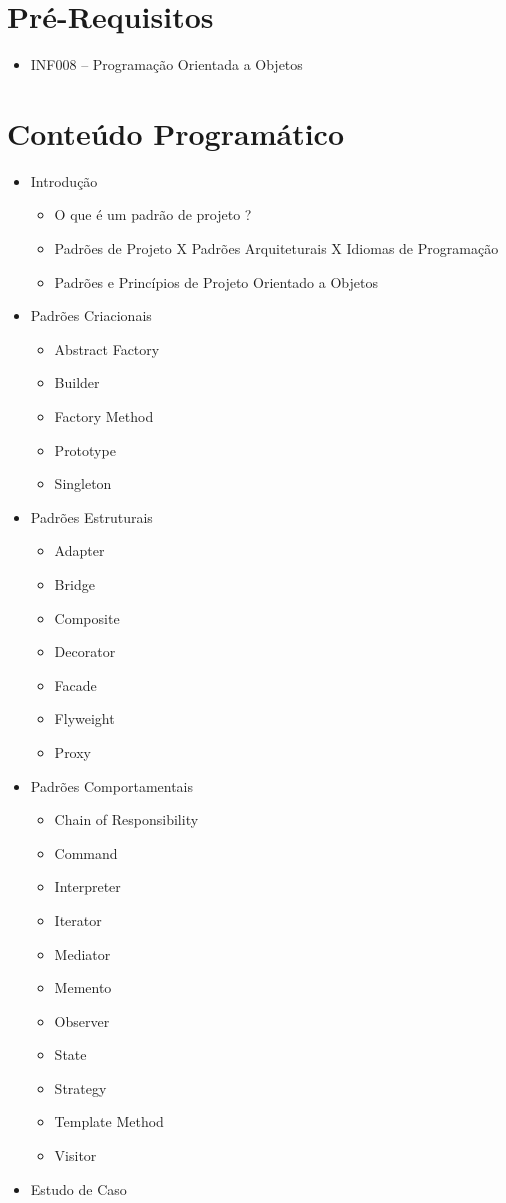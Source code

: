\documentclass[11pt,a4paper,sans]{moderncv}
\begin{document}
\section{Pré-Requisitos}
\begin{itemize}%
	\item INF008 -- Programação Orientada a Objetos
\end{itemize}

\section{Conteúdo Programático}
\begin{itemize}
\item Introdução
\begin{itemize}
\item O que é um padrão de projeto ?
\item Padrões de Projeto X Padrões Arquiteturais X Idiomas de Programação
\item Padrões e Princípios de Projeto Orientado a Objetos
\end{itemize}
\item Padrões Criacionais
\begin{itemize}
\item Abstract Factory
\item Builder
\item Factory Method
\item Prototype
\item Singleton
\end{itemize}
\item Padrões Estruturais
\begin{itemize}
\item Adapter
\item Bridge
\item Composite
\item Decorator
\item Facade
\item Flyweight
\item Proxy
\end{itemize}
\item Padrões Comportamentais
\begin{itemize}
\item Chain of Responsibility
\item Command
\item Interpreter
\item Iterator
\item Mediator
\item Memento
\item Observer
\item State
\item Strategy
\item Template Method
\item Visitor
\end{itemize}
\item Estudo de Caso
\end{itemize}
\end{document}
